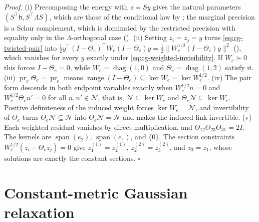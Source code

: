 \noindent\emph{Proof.}
(i) Precomposing the energy with \(z=Sy\) gives the natural parameters
\((S^\top\mathsf h,S^\top\Lambda S)\), which are those of the conditional law by
; the marginal precision is a Schur
complement, which is dominated by the restricted precision with equality only
in the \(\Lambda\)-orthogonal case
(). (ii) Setting
\(z_i=z_j=y\) turns \eqref{eq:cg-twisted-pair} into
\(\frac12y^\top(I-\Theta_e)^\top W_e(I-\Theta_e)y
=\frac12\|W_e^{1/2}(I-\Theta_e)y\|^2\) (), which
vanishes for every \(y\) exactly under \eqref{eq:cg-weighted-invisibility}. If
\(W_e\succ0\) this forces \(I-\Theta_e=0\), while
\(W_e=\operatorname{diag}(1,0)\) and \(\Theta_e=\operatorname{diag}(1,2)\)
satisfy it. (iii) \(\operatorname{pr}_e\Theta_e=\operatorname{pr}_e\) means
\(\operatorname{range}(I-\Theta_e)\subseteq\ker W_e=\ker W_e^{1/2}\). (iv) The
pair form descends in both endpoint variables exactly when
\(W_e^{1/2}n=0\) and \(W_e^{1/2}\Theta_en'=0\) for all \(n,n'\in\mathscr N\), that
is, \(\mathscr N\subseteq\ker W_e\) and \(\Theta_e\mathscr N\subseteq\ker W_e\).
Positive definiteness of the induced weight forces \(\ker W_e=\mathscr N\), and
invertibility of \(\Theta_e\) turns \(\Theta_e\mathscr N\subseteq\mathscr N\) into
\(\Theta_e\mathscr N=\mathscr N\) and makes the induced link invertible. (v) Each
weighted residual vanishes by direct multiplication, and
\(\Theta_{12}\Theta_{23}\Theta_{31}=2I\). The kernels are
\(\operatorname{span}(e_2)\), \(\operatorname{span}(e_1)\), and \(\{0\}\). The
section constraints \(W_e^{1/2}(z_i-\Theta_ez_j)=0\) give
\(z_1^{(1)}=z_2^{(1)}\), \(z_2^{(2)}=z_3^{(2)}\), and \(z_3=z_1\), whose solutions
are exactly the constant sections. \(\square\)

\section{Constant-metric Gaussian relaxation}
\label{sec:cg-gaussian-fixed-relaxation}

